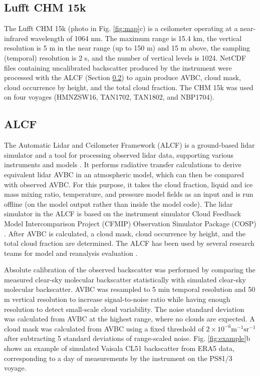 \documentclass[draft]{agujournal2019}
\begin{document}
\subsection{Lufft CHM 15k}
\label{sec:chm15k}

The Lufft CHM 15k (photo in Fig. \ref{fig:map}c) is a ceilometer operating at a
near-infrared wavelength of 1064 nm. The maximum range is 15.4 km, the vertical
resolution is 5 m in the near range (up to 150 m) and 15 m above, the sampling
(temporal) resolution is 2 s, and the number of vertical levels is 1024.
NetCDF files containing uncalibrated backscatter produced by the instrument
were processed with the ALCF (Section \ref{sec:alcf}) to again produce AVBC,
cloud mask, cloud occurrence by height, and the total cloud fraction. The CHM
15k was used on four voyages (HMNZSW16, TAN1702, TAN1802, and NBP1704).

\subsection{ALCF}
\label{sec:alcf}

The Automatic Lidar and Ceilometer Framework (ALCF) is a ground-based lidar
simulator and a tool for processing observed lidar data, supporting various
instruments and models . It performs radiative transfer
calculations to derive equivalent lidar AVBC in an atmospheric model, which can
then be compared with observed AVBC. For this purpose, it takes the cloud
fraction, liquid and ice mass mixing ratio, temperature, and pressure model
fields as an input and is run offline (on the model output rather than inside
the model code). The lidar simulator in the ALCF is based on the instrument
simulator Cloud Feedback Model Intercomparison Project (CFMIP) Observation
Simulator Package (COSP) .  After AVBC is calculated,
a cloud mask, cloud occurrence by height, and the total cloud fraction are
determined. The ALCF has been used by several research teams for model and
reanalysis evaluation
.

Absolute calibration of the observed backscatter was performed by comparing the
measured clear-sky molecular backscatter statistically with simulated clear-sky
molecular backscatter. AVBC was resampled to 5 min temporal resolution and 50 m
vertical resolution to increase signal-to-noise ratio while having enough
resolution to detect small-scale cloud variability. The noise standard
deviation was calculated from AVBC at the highest range, where no clouds are
expected.  A cloud mask was calculated from AVBC using a fixed threshold of
$\mathrm{2\times 10^{-6} m^{-1}sr^{-1}}$ after subtracting 5 standard
deviations of range-scaled noise. Fig. \ref{fig:example}b shows an example of
simulated Vaisala CL51 backscatter from ERA5 data, corresponding to a day of
measurements by the instrument on the PS81/3 voyage.
\end{document}
